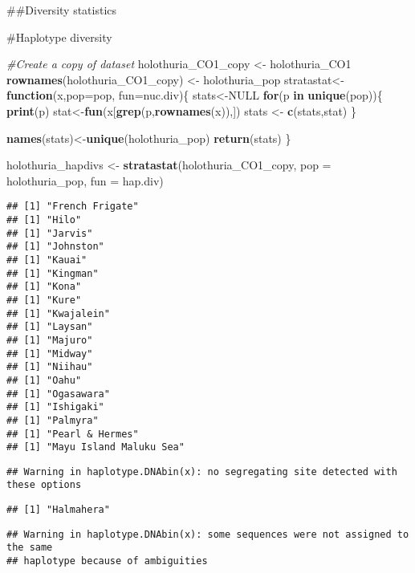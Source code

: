 \documentclass[
]{article}
\newenvironment{Shaded}{\begin{snugshade}}{\end{snugshade}}
\newcommand{\CommentTok}[1]{\textcolor[rgb]{0.56,0.35,0.01}{\textit{#1}}}
\newcommand{\ControlFlowTok}[1]{\textcolor[rgb]{0.13,0.29,0.53}{\textbf{#1}}}
\newcommand{\DataTypeTok}[1]{\textcolor[rgb]{0.13,0.29,0.53}{#1}}
\newcommand{\KeywordTok}[1]{\textcolor[rgb]{0.13,0.29,0.53}{\textbf{#1}}}
\newcommand{\NormalTok}[1]{#1}
\newcommand{\OtherTok}[1]{\textcolor[rgb]{0.56,0.35,0.01}{#1}}
\newcommand{\StringTok}[1]{\textcolor[rgb]{0.31,0.60,0.02}{#1}}
\begin{document}
\#\#Diversity statistics

\#Haplotype diversity

\begin{Shaded}
\begin{Highlighting}[]
\CommentTok{#Create a copy of dataset}
\NormalTok{holothuria_CO1_copy <-}\StringTok{ }\NormalTok{holothuria_CO1}
\KeywordTok{rownames}\NormalTok{(holothuria_CO1_copy) <-}\StringTok{ }\NormalTok{holothuria_pop}
\NormalTok{stratastat<-}\ControlFlowTok{function}\NormalTok{(x,}\DataTypeTok{pop=}\NormalTok{pop, }\DataTypeTok{fun=}\NormalTok{nuc.div)\{}
\NormalTok{  stats<-}\OtherTok{NULL}
  \ControlFlowTok{for}\NormalTok{(p }\ControlFlowTok{in} \KeywordTok{unique}\NormalTok{(pop))\{}
    \KeywordTok{print}\NormalTok{(p)}
\NormalTok{    stat<-}\KeywordTok{fun}\NormalTok{(x[}\KeywordTok{grep}\NormalTok{(p,}\KeywordTok{rownames}\NormalTok{(x)),])}
\NormalTok{    stats <-}\StringTok{ }\KeywordTok{c}\NormalTok{(stats,stat)}
\NormalTok{  \}}
  
  \KeywordTok{names}\NormalTok{(stats)<-}\KeywordTok{unique}\NormalTok{(holothuria_pop)}
  \KeywordTok{return}\NormalTok{(stats)}
\NormalTok{\}}

\NormalTok{holothuria_hapdivs <-}\StringTok{ }\KeywordTok{stratastat}\NormalTok{(holothuria_CO1_copy, }\DataTypeTok{pop =}\NormalTok{ holothuria_pop, }\DataTypeTok{fun =}\NormalTok{ hap.div)}
\end{Highlighting}
\end{Shaded}

\begin{verbatim}
## [1] "French Frigate"
## [1] "Hilo"
## [1] "Jarvis"
## [1] "Johnston"
## [1] "Kauai"
## [1] "Kingman"
## [1] "Kona"
## [1] "Kure"
## [1] "Kwajalein"
## [1] "Laysan"
## [1] "Majuro"
## [1] "Midway"
## [1] "Niihau"
## [1] "Oahu"
## [1] "Ogasawara"
## [1] "Ishigaki"
## [1] "Palmyra"
## [1] "Pearl & Hermes"
## [1] "Mayu Island Maluku Sea"
\end{verbatim}

\begin{verbatim}
## Warning in haplotype.DNAbin(x): no segregating site detected with these options
\end{verbatim}

\begin{verbatim}
## [1] "Halmahera"
\end{verbatim}

\begin{verbatim}
## Warning in haplotype.DNAbin(x): some sequences were not assigned to the same
## haplotype because of ambiguities
\end{verbatim}
\end{document}
